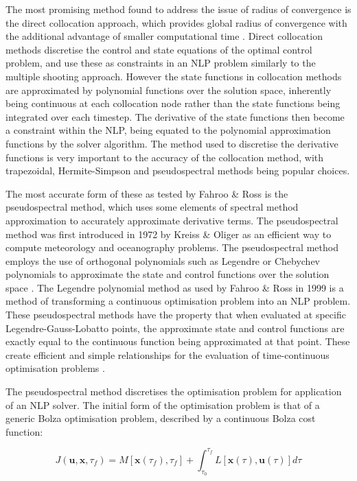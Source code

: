 The most promising method found to address the issue of radius of convergence is the direct collocation approach, which provides global radius of convergence with the additional advantage of smaller computational time \cite{Fasano2013}. Direct collocation methods discretise the control and state equations of the optimal control problem, and use these as constraints in an NLP problem similarly to the multiple shooting approach. However the state functions in collocation methods are approximated by polynomial functions over the solution space, inherently being continuous at each collocation node rather than the state functions being integrated over each timestep. The derivative of the state functions then become a constraint within the NLP, being equated to the polynomial approximation functions by the solver algorithm. The method used to discretise the derivative functions is very important to the accuracy of the collocation method, with trapezoidal, Hermite-Simpson and pseudospectral methods being popular choices.


The most accurate form of these as tested by Fahroo \& Ross \cite{Fahroo2000} is the pseudospectral method, which uses some elements of spectral method approximation to accurately approximate derivative terms. The pseudospectral method was first introduced in 1972 by Kreiss \& Oliger \cite{Kreiss1972} as an efficient way to compute meteorology and oceanography problems. The pseudospectral method employs the use of orthogonal polynomials such as Legendre or Chebychev polynomials to approximate the state and control functions over the solution space \cite{Fahroo2000}. The Legendre polynomial method as used by Fahroo \& Ross in 1999 \cite{Fahroo1999} is a method of transforming a continuous optimisation problem into an NLP problem. These pseudospectral methods have the property that when evaluated at specific Legendre-Gauss-Lobatto points, the approximate state and control functions are exactly equal to the continuous function being approximated at that point. These create efficient and simple relationships for the evaluation of time-continuous optimisation problems \cite{Fahroo2000}.  

The pseudospectral method discretises the optimisation problem for application of an NLP solver. The initial form of the optimisation problem is that of a generic Bolza optimisation problem, described by a continuous Bolza cost function:

\begin{equation} \label{eq:cost}
J(\textbf{u},\textbf{x},\tau_f) = M[\textbf{x}(\tau_f),\tau_f] +   \int_{\tau_0}^{\tau_f} L[\textbf{x}(\tau),\textbf{u}(\tau)] d\tau
\end{equation}

